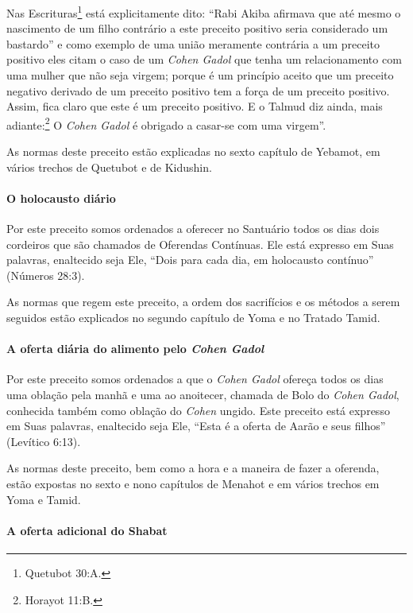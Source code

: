 Nas Escrituras\footnote{Quetubot 30:A.} está explicitamente dito: ``Rabi
Akiba afirmava que até mesmo o nascimento de um filho contrário a este
preceito positivo seria considerado um bastardo'' e como exemplo de uma
união meramente contrária a um preceito positivo eles citam o caso de um
\textit{Cohen Gadol} que tenha um relacionamento com uma mulher que não seja
virgem; porque é um princípio aceito que um preceito negativo derivado
de um preceito positivo tem a força de um preceito positivo. Assim, fica
claro que este é um preceito positivo. E o Talmud diz ainda, mais
adiante:\footnote{Horayot 11:B.} O \textit{Cohen Gadol} é obrigado a casar-se com
uma virgem''.

As normas deste preceito estão explicadas no sexto capítulo de Yebamot,
em vários trechos de Quetubot e de Kidushin.

\paragraph{O holocausto diário}

Por este preceito somos ordenados a oferecer no Santuário todos os dias
dois cordeiros que são chamados de Oferendas Contínuas. Ele está
expresso em Suas palavras, enaltecido seja Ele, ``Dois para cada dia,
em holocausto contínuo'' (Números 28:3).

As normas que regem este preceito, a ordem dos sacrifícios e os métodos
a serem seguidos estão explicados no segundo capítulo de Yoma e no
Tratado Tamid.

\paragraph{A oferta diária do alimento pelo \textit{Cohen Gadol}}

Por este preceito somos ordenados a que o \textit{Cohen Gadol} ofereça todos
os dias uma oblação pela manhã e uma ao anoitecer, chamada de Bolo
do \textit{Cohen Gadol}, conhecida também como oblação do \textit{Cohen} ungido.
Este preceito está expresso em Suas palavras, enaltecido seja Ele,
``Esta é a oferta de Aarão e seus filhos'' (Levítico 6:13).

As normas deste preceito, bem como a hora e a maneira de fazer a
oferenda, estão expostas no sexto e nono capítulos de Menahot e em
vários trechos em Yoma e Tamid.

\paragraph{A oferta adicional do Shabat}

